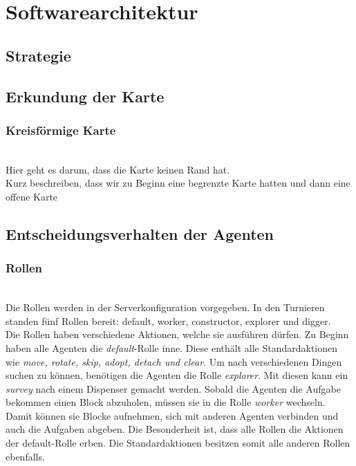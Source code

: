 \section{Softwarearchitektur}

\subsection{Strategie}


\subsection{Erkundung der Karte} \label{erkundungDerKarte}

\subsubsection{Kreisförmige Karte} ~\\

Hier geht es darum, dass die Karte keinen Rand hat. \\
Kurz beschreiben, dass wir zu Beginn eine begrenzte Karte hatten und dann eine offene Karte

\subsection{Entscheidungsverhalten der Agenten}

\subsubsection{Rollen} ~\\
Die Rollen werden in der Serverkonfiguration vorgegeben. In den Turnieren standen fünf Rollen bereit: default, worker, constructor, explorer und digger. \\
Die Rollen haben verschiedene Aktionen, welche sie ausführen dürfen. Zu Beginn haben alle Agenten die \textit{default}-Rolle inne. Diese enthält alle Standardaktionen wie \textit{move, rotate, skip, adopt, detach und clear}. Um nach verschiedenen Dingen suchen zu können, benötigen die Agenten die Rolle \textit{explorer}. Mit diesen kann ein \textit{survey} nach einem Dispenser gemacht werden. Sobald die Agenten die Aufgabe bekommen einen Block abzuholen, müssen sie in die Rolle \textit{worker} wechseln. Damit können sie Blocke aufnehmen, sich mit anderen Agenten verbinden und auch die Aufgaben abgeben. 
Die Besonderheit ist, dass alle Rollen die Aktionen der default-Rolle erben. Die Standardaktionen besitzen somit alle anderen Rollen ebenfalls.

